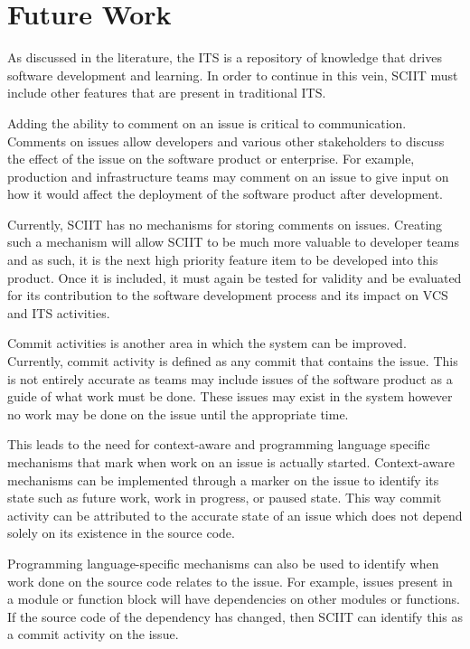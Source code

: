 \documentclass{mproj}
\begin{document}
\section{Future Work}

As discussed in the literature, the ITS is a repository of knowledge that drives software development and learning. In order to continue in this vein, SCIIT must include other features that are present in traditional ITS.

Adding the ability to comment on an issue is critical to communication. Comments on issues allow developers and various other stakeholders to discuss the effect of the issue on the software product or enterprise. For example, production and infrastructure teams may comment on an issue to give input on how it would affect the deployment of the software product after development.

Currently, SCIIT has no mechanisms for storing comments on issues. Creating such a mechanism will allow SCIIT to be much more valuable to developer teams and as such, it is the next high priority feature item to be developed into this product. Once it is included, it must again be tested for validity and be evaluated for its contribution to the software development process and its impact on VCS and ITS activities.

Commit activities is another area in which the system can be improved. Currently, commit activity is defined as any commit that contains the issue. This is not entirely accurate as teams may include issues of the software product as a guide of what work must be done. These issues may exist in the system however no work may be done on the issue until the appropriate time.

This leads to the need for context-aware and programming language specific mechanisms that mark when work on an issue is actually started. Context-aware mechanisms can be implemented through a marker on the issue to identify its state such as future work, work in progress, or paused state. This way commit activity can be attributed to the accurate state of an issue which does not depend solely on its existence in the source code.

Programming language-specific mechanisms can also be used to identify when work done on the source code relates to the issue. For example, issues present in a module or function block will have dependencies on other modules or functions. If the source code of the dependency has changed, then SCIIT can identify this as a commit activity on the issue.
\end{document}
